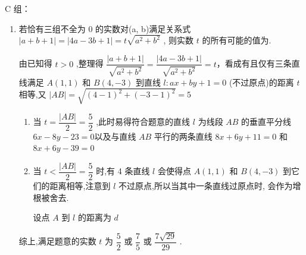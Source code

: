 C 组：
\begin{enumerate}
    \item 若恰有三组不全为 0 的实数对(a, b)满足关系式 $\left| {a + b + 1}\right|  = \left| {{4a} - {3b} + 1}\right|  = t\sqrt{{a}^{2} + {b}^{2}}$ , 则实数 $t$ 的所有可能的值为.
    \begin{jieda}
        由已知得 $t > 0$ ,整理得 $\dfrac{\left| a + b + 1\right| }{\sqrt{{a}^{2} + {b}^{2}}} = \dfrac{\left| 4a - 3b + 1\right| }{\sqrt{{a}^{2} + {b}^{2}}} = t$，看成有且仅有三条直线满足 $A\left( {1,1}\right)$ 和 $B\left( {4, - 3}\right)$ 到直线 $l : {ax} + {by} + 1 = 0$ (不过原点)的距离 $t$ 相等,又 $\left| {AB}\right|  = \sqrt{{\left( 4 - 1\right) }^{2} + {\left( -3 - 1\right) }^{2}} = 5$
        \begin{enumerate}
            \item 当 $t = \dfrac{\left| AB\right| }{2} = \dfrac{5}{2}$ ,此时易得符合题意的直线 $l$ 为线段 ${AB}$ 的垂直平分线 ${6x} - {8y} - {23} = 0$以及与直线 ${AB}$ 平行的两条直线 ${8x} + {6y} + {11} = 0$ 和 ${8x} + {6y} - {39} = 0$
            \item 当 $t < \dfrac{\left| AB\right| }{2} = \dfrac{5}{2}$ 时,有 4 条直线 $l$ 会使得点 $A\left( {1,1}\right)$ 和 $B\left( {4, - 3}\right)$ 到它们的距离相等,注意到 $l$ 不过原点,所以当其中一条直线过原点时, 会作为增根被舍去.
            
            设点 $A$ 到 $l$ 的距离为 $d$
        \end{enumerate}
        综上,满足题意的实数 $t$ 为 $\dfrac{5}{2}$ 或 $\dfrac{7}{5}$ 或 $\dfrac{7\sqrt{29}}{29}$ .
    \end{jieda}
    

\end{enumerate}
